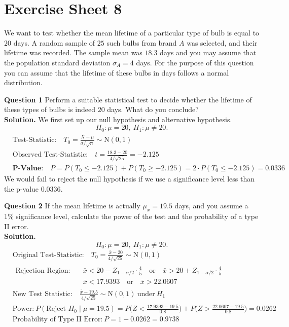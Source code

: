 \documentclass[
]{book}
\begin{document}
\chapter{Exercise Sheet 8}\label{exercise-sheet-8}

We want to test whether the mean lifetime of a particular type of bulb is equal to \(20\) days. A random sample of \(25\) such bulbs from brand \(A\) was selected, and their lifetime was recorded. The sample mean was \(18.3\) days and you may assume that the population standard deviation \(\sigma_A = 4\) days. For the purpose of this question you can assume that the lifetime of these bulbs in days follows a normal distribution.

\textbf{Question 1} Perform a suitable statistical test to decide whether the lifetime of these types of bulbs is indeed \(20\) days. What do you conclude?\\
\textbf{Solution.} We first set up our null hypothesis and alternative hypothesis.\[H_0: \mu = 20, \ H_1: \mu \neq 20.\] \[\begin{aligned} & \text{Test-Statistic:} \quad T_0 = \frac{\bar{X} - \mu}{\sigma / \sqrt{n}} \sim \text{N}(0,1) \\
& \text{Observed Test-Statistic:} \quad t = \frac{18.3 - 20}{4 / \sqrt{25}} = -2.125 \\[0.3em]
& \textbf{P-Value:} \quad P = P(T_0 \leq -2.125) + P(T_0 \geq -2.125) = 2 \cdot P(T_0 \leq -2.125) = 0.0336 \end{aligned}\]
We would fail to reject the null hypothesis if we use a significance level less than the p-value \(0.0336\).

\textbf{Question 2} If the mean lifetime is actually \(\mu_x = 19.5\) days, and you assume a \(1\%\) significance level, calculate the power of the test and the probability of a type II error.\\
\textbf{Solution.} \[H_0: \mu = 20, \ H_1: \mu \neq 20.\]
\[\begin{aligned} & \text{Original Test-Statistic:} \quad T_0 = \frac{\bar{x} - 20}{4/\sqrt{25}} \sim \text{N}(0,1) \\
& \begin{aligned} \text{Rejection Region:} \quad & \bar{x} < 20 - Z_{1-\alpha/2} \cdot \frac{4}{5} \quad \text{or} \quad \bar{x} > 20 + Z_{1-\alpha/2} \cdot \frac{4}{5} \\[0.5em]
& \bar{x} < 17.9393 \quad \text{or} \quad \bar{x} > 22.0607
\end{aligned} \\[0.5em]
& \text{New Test Statistic:} \quad \frac{\bar{x} - 19.5}{4 / \sqrt{25}} \sim \text{N}(0,1) \ \text{under} \ H_1 \\[0.5em]
& \text{Power:} \ P(\text{Reject } H_0 \mid \mu = 19.5) = P\bigg(Z < \frac{17.9393 - 19.5}{0.8} \bigg) + P \bigg(Z > \frac{22.0607 - 19.5}{0.8} \bigg) = 0.0262 \\[0.5em]
& \text{Probability of Type II Error:} \ P = 1 - 0.0262 = 0.9738
\end{aligned}\]
\end{document}
